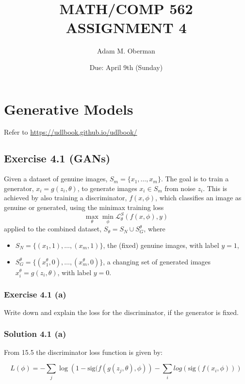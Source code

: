 \documentclass[
10pt, %
a4paper, %
oneside, %
headinclude,footinclude, %
BCOR5mm, %
]{scrartcl}
\title{\normalfont\spacedallcaps{Language reclamation: Literature review}} %
\author{\spacedlowsmallcaps{Caleb Moses*}} %
\date{} %
\begin{document}
\title{MATH/COMP 562 ASSIGNMENT 4}
\date{Due: April 9th (Sunday)}
\author{Adam M. Oberman}
\maketitle

\section*{Generative Models}
Refer to \url{https://udlbook.github.io/udlbook/}

\subsection*{Exercise 4.1 (GANs)}

Given a dataset of genuine images, $S_m = \{x_1, \ldots, x_m\}$. The goal is to train a generator, $x_i = g(z_i, \theta)$, to generate images $x_i \in S_m$ from noise $z_i$. This is achieved by also training a discriminator, $f(x, \phi)$, which classifies an image as genuine or generated, using the minimax training loss
\begin{equation*}
\max_\theta \min_\phi \mathcal{L}^S_\theta(f(x, \phi), y)
\end{equation*}
applied to the combined dataset, $S_\theta = S_N \cup S_G^\theta$,
where
\begin{itemize}
    \item $S_N = \{(x_1, 1), \ldots, (x_m, 1)\}$, the (fixed) genuine images, with label $y = 1$,
    \item $S_G^\theta = \{(x^\theta_1, 0), \ldots, (x^\theta_m, 0)\}$, a changing set of generated images $x^\theta_i = g(z_i, \theta)$, with label $y = 0$.
\end{itemize}

\subsubsection*{Exercise 4.1 (a)}
Write down and explain the loss for the discriminator, if the generator is fixed.

\subsubsection*{Solution 4.1 (a)}

From \citet{prince2023understanding} 15.5 the discriminator loss function is given by:

\begin{equation*}
  L(\phi) = - \sum_j \log\left(1 - \textrm{sig}(f(g(z_j, \theta), \phi)\right) - \sum_i log\left(\textrm{sig}(f(x_i, \phi))\right)
\end{equation*}
\end{document}
